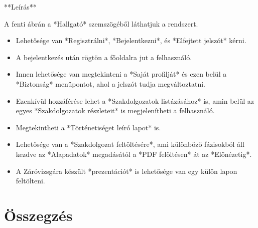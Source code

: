 \documentclass[a4paper,12pt]{article}
\begin{document}
**Leírás**

A fenti ábrán a *Hallgató* szemszögéből láthatjuk a rendszert. 

\begin{itemize}
	\item Lehetősége van *Regisztrálni*, *Bejelentkezni*, és *Elfejtett jelszót* kérni. 
	\item A bejelentkezés után rögtön a főoldalra jut a felhasználó. 
	\item Innen lehetősége van megtekinteni a *Saját profilját* és ezen belül a *Biztonság* menüpontot, ahol a jelszót tudja megváltoztatni. 
	\item Ezenkívül hozzáférése lehet a *Szakdolgozatok listázásához* is, amin belül az egyes *Szakdolgozatok részleteit* is megjelenítheti a felhasználó. 
	\item Megtekintheti a *Történetiséget leíró lapot* is. 
	\item Lehetősége van a *Szakdolgozat feltöltésére*, ami különböző fázisokból áll kezdve az *Alapadatok* megadásától a *PDF felöltésen* át az *Előnézetig*. 
	\item A Záróvizsgára készült *prezentációt* is lehetősége van egy külön lapon feltölteni.
\end{itemize}


\section{Összegzés}
\end{document}
